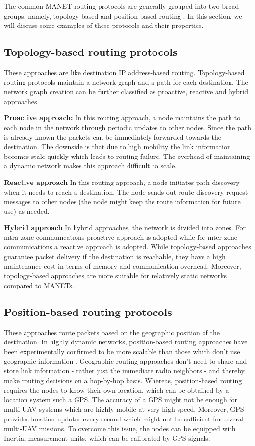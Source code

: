 The common MANET routing protocols are generally grouped into two broad groups, namely, topology-based and position-based routing \cite{6238283}. In this section, we will discuss some examples of these protocols and their properties.

\subsection{Topology-based routing protocols}
These approaches are like destination IP address-based routing. Topology-based routing protocols maintain a network graph and a path for each destination. The network graph creation can be further classified as proactive, reactive and hybrid approaches. 

\textbf{Proactive approach:} In this routing approach, a node maintains the path to each node in the network through periodic updates to other nodes. Since the path is already known the packets can be immediately forwarded towards the destination. The downside is that due to high mobility the link information becomes stale quickly which leads to routing failure. The overhead of maintaining a dynamic network makes this approach difficult to scale.

\textbf{Reactive approach} In this routing approach, a node initiates path discovery when it needs to reach a destination. The node sends out route discovery request messages to other nodes (the node might keep the route information for future use) as needed. 

\textbf{Hybrid approach} In hybrid approaches, the network is divided into zones. For intra-zone communications proactive approach is adopted while for inter-zone communications a reactive approach is adopted. 
While topology-based approaches guarantee packet delivery if the destination is reachable, they have a high maintenance cost in terms of memory and communication overhead. Moreover, topology-based approaches are more suitable for relatively static networks compared to MANETs.

\subsection{Position-based routing protocols}
These approaches route packets based on the geographic position of the destination. In highly dynamic networks, position-based routing approaches have been experimentally confirmed to be more scalable than those which don't use geographic information \cite{Stojmenovic:2002:PRA:2288474.2290160}. Geographic routing approaches don't need to share and store link information - rather just the immediate radio neighbors - and thereby make routing decisions on a hop-by-hop basis. Whereas, position-based routing requires the nodes to know their own location, which can be obtained by a location system such a GPS. The accuracy of a GPS might not be enough for multi-UAV systems which are highly mobile at very high speed. Moreover, GPS provides location updates every second which might not be sufficient for several multi-UAV missions. To overcome this issue, the nodes can be equipped with Inertial measurement units, which can be calibrated by GPS signals.


